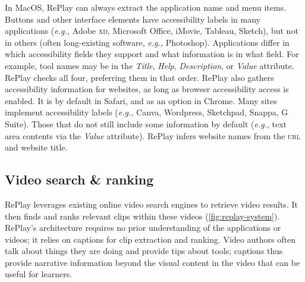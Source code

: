 In Mac\-OS, RePlay can always extract the application name and menu items. Buttons and other interface elements have accessibility labels in many applications (\textit{e.g.,} Adobe \textsc{xd}, Microsoft Office, iMovie, Tableau, Sketch), but not in others (often long-existing software, \textit{e.g.,} Photoshop). Applications differ in which accessibility fields they support and what information is in what field. For example, tool names may be in the \textit{Title}, \textit{Help}, \textit{Description}, or \textit{Value} attribute. RePlay checks all four, preferring them in that order. RePlay also gathers accessibility information for websites, as long as browser accessibility access is enabled. It is by default in Safari, and as an option in Chrome. Many sites implement accessibility labels (\textit{e.g., } Canva, Wordpress, Sketchpad, Snappa, G Suite). Those that do not still include some information by default (\textit{e.g.}, text area contents via the \textit{Value} attribute). RePlay infers website names from the \textsc{url} and website title.

\subsection{Video search \& ranking}
RePlay leverages existing online video search engines to retrieve video results. It then finds and ranks relevant clips within these videos (\autoref{fig:replay-system}). RePlay's architecture requires no prior understanding of the applications or videos; it relies on captions for clip extraction and ranking. Video authors often talk about things they are doing and provide tips about tools; captions thus provide narrative information beyond the visual content in the video that can be useful for learners.

